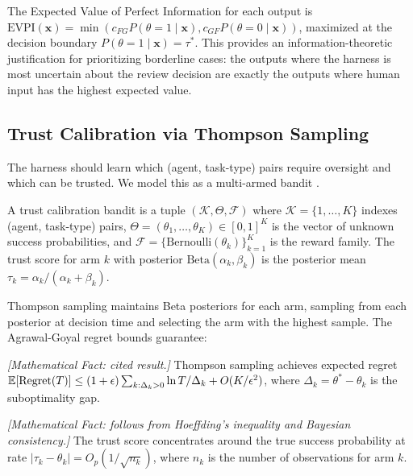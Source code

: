 The Expected Value of Perfect Information for each output is $\text{EVPI}(\mathbf{x}) = \min(c_{FG} P(\theta=1 \mid \mathbf{x}), c_{GF} P(\theta=0 \mid \mathbf{x}))$, maximized at the decision boundary $P(\theta=1 \mid \mathbf{x}) = \tau^*$. This provides an information-theoretic justification for prioritizing borderline cases: the outputs where the harness is most uncertain about the review decision are exactly the outputs where human input has the highest expected value.

\subsection{Trust Calibration via Thompson Sampling}

The harness should learn which (agent, task-type) pairs require oversight and which can be trusted. We model this as a multi-armed bandit \citep{thompson1933likelihood}.

\begin{definition}
\label{def:trust-bandit}
A trust calibration bandit is a tuple $(\mathcal{K}, \Theta, \mathcal{F})$ where $\mathcal{K} = \{1, \ldots, K\}$ indexes (agent, task-type) pairs, $\Theta = (\theta_1, \ldots, \theta_K) \in [0,1]^K$ is the vector of unknown success probabilities, and $\mathcal{F} = \{\text{Bernoulli}(\theta_k)\}_{k=1}^K$ is the reward family. The trust score for arm $k$ with posterior $\text{Beta}(\alpha_k, \beta_k)$ is the posterior mean $\tau_k = \alpha_k / (\alpha_k + \beta_k)$.
\end{definition}

Thompson sampling maintains Beta posteriors for each arm, sampling from each posterior at decision time and selecting the arm with the highest sample. The Agrawal-Goyal regret bounds \citep{agrawal2012analysis} guarantee:

\begin{theorem}
\emph{[Mathematical Fact: cited result.]}
\label{thm:regret}
Thompson sampling achieves expected regret $\mathbb{E}[\textup{Regret}(T)] \leq (1+\epsilon) \sum_{k: \Delta_k > 0} \ln T / \Delta_k + O(K/\epsilon^2)$, where $\Delta_k = \theta^* - \theta_k$ is the suboptimality gap.
\end{theorem}

\begin{proposition}
\emph{[Mathematical Fact: follows from Hoeffding's inequality and Bayesian consistency.]}
\label{prop:concentration}
The trust score concentrates around the true success probability at rate $|\tau_k - \theta_k| = O_p(1/\sqrt{n_k})$, where $n_k$ is the number of observations for arm $k$.
\end{proposition}

